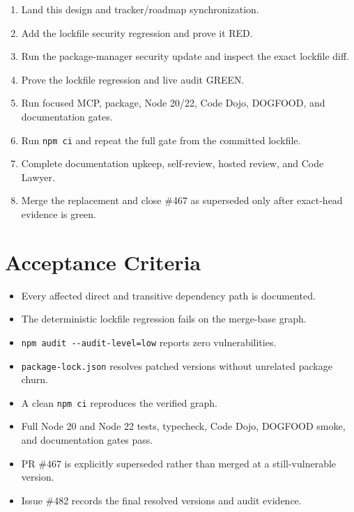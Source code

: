\begin{enumerate}
\def\labelenumi{\arabic{enumi}.}
\tightlist
\item
  Land this design and tracker/roadmap synchronization.
\item
  Add the lockfile security regression and prove it RED.
\item
  Run the package-manager security update and inspect the exact lockfile diff.
\item
  Prove the lockfile regression and live audit GREEN.
\item
  Run focused MCP, package, Node 20/22, Code Dojo, DOGFOOD, and documentation gates.
\item
  Run \texttt{n\allowbreak{}p\allowbreak{}m\allowbreak{} \allowbreak{}c\allowbreak{}i} and repeat the full gate from the committed lockfile.
\item
  Complete documentation upkeep, self-review, hosted review, and Code Lawyer.
\item
  Merge the replacement and close \#467 as superseded only after exact-head evidence is green.
\end{enumerate}

\section{Acceptance Criteria}\label{record-248-acceptance-criteria}

\begin{itemize}
\tightlist
\item[$\boxtimes$]
  Every affected direct and transitive dependency path is documented.
\item[$\boxtimes$]
  The deterministic lockfile regression fails on the merge-base graph.
\item[$\boxtimes$]
  \texttt{n\allowbreak{}p\allowbreak{}m\allowbreak{} \allowbreak{}a\allowbreak{}u\allowbreak{}d\allowbreak{}i\allowbreak{}t\allowbreak{} \allowbreak{}-\allowbreak{}-\allowbreak{}a\allowbreak{}u\allowbreak{}d\allowbreak{}i\allowbreak{}t\allowbreak{}-\allowbreak{}l\allowbreak{}e\allowbreak{}v\allowbreak{}e\allowbreak{}l\allowbreak{}=\allowbreak{}l\allowbreak{}o\allowbreak{}w} reports zero vulnerabilities.
\item[$\boxtimes$]
  \texttt{p\allowbreak{}a\allowbreak{}c\allowbreak{}k\allowbreak{}a\allowbreak{}g\allowbreak{}e\allowbreak{}-\allowbreak{}l\allowbreak{}o\allowbreak{}c\allowbreak{}k\allowbreak{}.\allowbreak{}j\allowbreak{}s\allowbreak{}o\allowbreak{}n} resolves patched versions without unrelated package churn.
\item[$\boxtimes$]
  A clean \texttt{n\allowbreak{}p\allowbreak{}m\allowbreak{} \allowbreak{}c\allowbreak{}i} reproduces the verified graph.
\item[$\square$]
  Full Node 20 and Node 22 tests, typecheck, Code Dojo, DOGFOOD smoke, and documentation gates pass.
\item[$\square$]
  PR \#467 is explicitly superseded rather than merged at a still-vulnerable version.
\item[$\square$]
  Issue \#482 records the final resolved versions and audit evidence.
\end{itemize}

